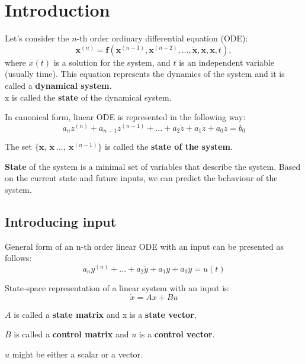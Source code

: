 
\section{Introduction}
\begin{tcolorbox}[colback=green!10,colframe=green!50!black,title=\textbf{Dynamical systems}]
    Let's consider the \(n\)-th order ordinary differential equation (ODE):
    \[
    \mathbf{x}^{(n)} = \mathbf{f}(\mathbf{x}^{(n-1)}, \mathbf{x}^{(n-2)}, ..., \ddot{\mathbf{x}}, \dot{\mathbf{x}}, \mathbf{x}, t),
    \]
    where \(x(t)\) is a solution for the system, and \(t\) is an independent variable (usually time).
    This equation represents the dynamics of the system and it is called a \textbf{dynamical system}.\\
    x is called the \textbf{state} of the dynamical system.
\end{tcolorbox}


In canonical form, linear ODE is represented in the following way:
\[a_{n}z^{(n)} +a_{n-1}z^{(n-1)}+...+a_{2}\ddot z+a_{1}\dot z + a_0 z= b_0\]

The set $\{ \mathbf{x}, \ \dot{\mathbf{x}} \ ..., \ \mathbf{x}^{(n-1)} \}$ is called the \textbf{state  of the system}.

\textbf{State} of the system is a minimal set of variables that describe the system. Based on the current state and future inputs,
we can predict the behaviour of the system. \\

\subsection{Introducing input}
General form of an n-th order linear ODE with an input can be presented as follows:
%
\begin{equation}
    a_n y^{(n)} + 
    ... +
    a_2 \ddot{y} + a_1 \dot{y} + 
    a_0 y = u(t)
\end{equation}

\bigskip

State-space representation of a linear system with an input is:
%
\begin{equation}
    \dot x = Ax + Bu
\end{equation}

$A$ is called a \textbf{state matrix} and x is a \textbf{state vector}, 

$B$ is called a \textbf{control matrix} and $u$ is a \textbf{control vector}.

$u$ might be either a scalar or a vector. 

